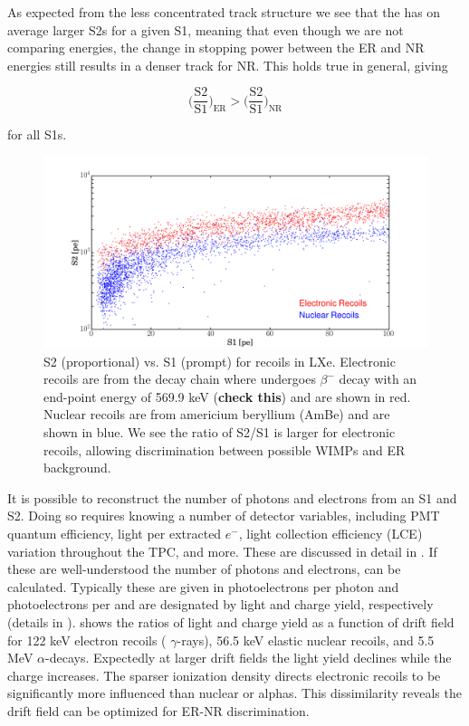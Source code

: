As expected from the less concentrated track structure we see that the 
has on average larger S2s for a given S1, meaning that even though we are not comparing energies, the change in stopping
power between the ER and NR energies still results in a denser track for NR.  This holds true in general, giving

\begin{equation}
\Big( \frac{\mathrm{S}2}{\mathrm{S}1} \Big)_{\mathrm{ER}} > \Big( \frac{\mathrm{S}2}{\mathrm{S}1} \Big)_{\mathrm{NR}}
\end{equation}

\noindent for all S1s.

\begin{figure}
\centering
\includegraphics[width=\textwidth]{ERNRComparison}
\caption{S2 (proportional) vs. S1 (prompt) for recoils in LXe.  Electronic recoils are from the  decay chain where
 undergoes $\beta^{-}$ decay with an end-point energy of 569.9 keV (\textbf{check this}) and are shown in red.  Nuclear
recoils are from americium beryllium (AmBe) and are shown in blue.  We see the ratio of S2/S1 is larger for electronic recoils,
allowing discrimination between possible WIMPs and ER background.}
\label{fig:tpcs_signals_ernr}
\end{figure}

It is possible to reconstruct the number of photons and electrons from an S1 and S2.  Doing so requires knowing a number of detector
variables, including PMT quantum efficiency, light per extracted $e^{-}$, light collection efficiency (LCE) variation throughout
the TPC, and more.  These are discussed in detail in \secref{}.  If these are well-understood the number of photons and electrons,
can be calculated.  Typically these are given in photoelectrons per photon and photoelectrons per \electron and are designated by
light and charge yield, respectively (details in \secref{}).   shows the ratios of light and
charge yield as a function of drift field for 122 keV electron recoils ( $\gamma$-rays), 56.5 keV elastic nuclear recoils, and
5.5 MeV $\alpha$-decays.  Expectedly at larger drift fields the light yield declines while the charge increases.  The sparser
ionization density directs electronic recoils to be significantly more influenced than nuclear or alphas.  This dissimilarity reveals
the drift field can be optimized for ER-NR discrimination.

